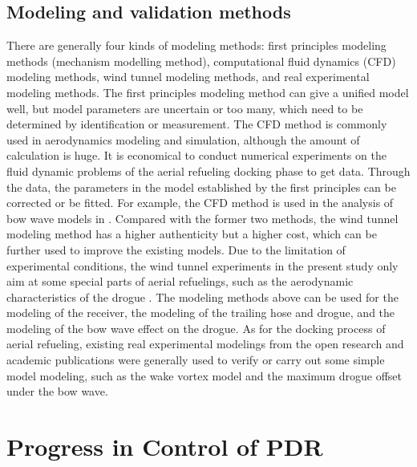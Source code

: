 \subsection{Modeling and validation methods}

There are generally four kinds of modeling methods: first principles
modeling methods (mechanism modelling method), computational fluid
dynamics (CFD) modeling methods, wind tunnel modeling methods, and
real experimental modeling methods. The first principles modeling
method can give a unified model well, but model parameters are uncertain
or too many, which need to be determined by identification or measurement.
The CFD method is commonly used in aerodynamics modeling and simulation,
although the amount of calculation is huge. It is economical to conduct
numerical experiments on the fluid dynamic problems of the aerial
refueling docking phase to get data. Through the data, the parameters
in the model established by the first principles can be corrected
or be fitted. For example, the CFD method is used in the analysis
of bow wave models in \cite{Dogan-2013-7}. Compared with the former
two methods, the wind tunnel modeling method has a higher authenticity
but a higher cost, which can be further used to improve the existing
models. Due to the limitation of experimental conditions, the wind
tunnel experiments in the present study only aim at some special parts
of aerial refuelings, such as the aerodynamic characteristics of the
drogue \cite{ro2006aerodynamic}. The modeling methods above can be
used for the modeling of the receiver, the modeling of the trailing
hose and drogue, and the modeling of the bow wave effect on the drogue.
As for the docking process of aerial refueling, existing real experimental
modelings from the open research and academic publications were generally
used to verify or carry out some simple model modeling, such as the
wake vortex model and the maximum drogue offset under the bow wave.

\section{Progress in Control of PDR}

